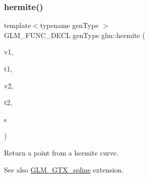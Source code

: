\subsubsection{\texorpdfstring{hermite()}{hermite()}}
{\footnotesize\ttfamily template$<$typename gen\+Type $>$ \\
G\+L\+M\+\_\+\+F\+U\+N\+C\+\_\+\+D\+E\+CL gen\+Type glm\+::hermite (\begin{DoxyParamCaption}\item[{gen\+Type const \&}]{v1,  }\item[{gen\+Type const \&}]{t1,  }\item[{gen\+Type const \&}]{v2,  }\item[{gen\+Type const \&}]{t2,  }\item[{typename gen\+Type\+::value\+\_\+type const \&}]{s }\end{DoxyParamCaption})}

Return a point from a hermite curve. \begin{DoxySeeAlso}{See also}
\hyperlink{group__gtx__spline}{G\+L\+M\+\_\+\+G\+T\+X\+\_\+spline} extension. 
\end{DoxySeeAlso}
